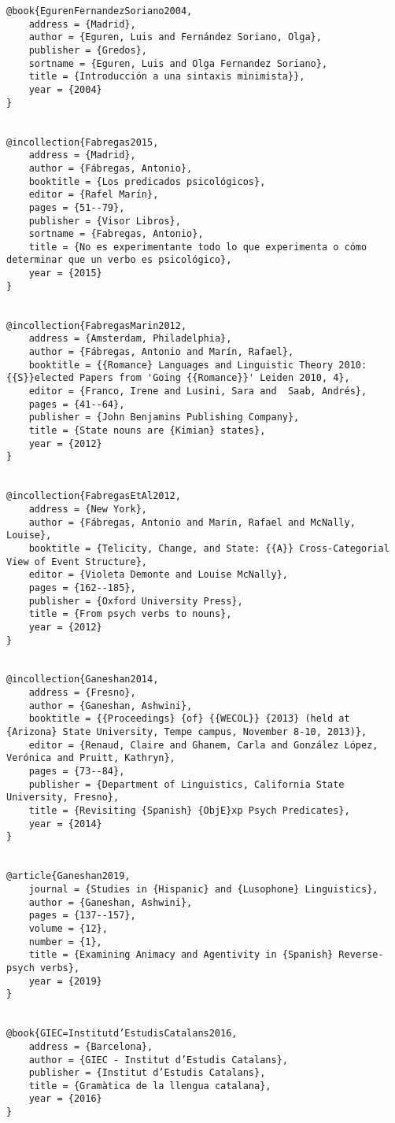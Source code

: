 \documentclass[output=paper,modfonts,nonflat,newtxmath]{langsci/langscibook}
\begin{document}
\begin{verbatim}
@book{EgurenFernandezSoriano2004,
	address = {Madrid},
	author = {Eguren, Luis and Fernández Soriano, Olga},
	publisher = {Gredos},
	sortname = {Eguren, Luis and Olga Fernandez Soriano},
	title = {Introducción a una sintaxis minimista}},
	year = {2004}
}


@incollection{Fabregas2015,
	address = {Madrid},
	author = {Fábregas, Antonio},
	booktitle = {Los predicados psicológicos},
	editor = {Rafel Marín},
	pages = {51--79},
	publisher = {Visor Libros},
	sortname = {Fabregas, Antonio},
	title = {No es experimentante todo lo que experimenta o cómo determinar que un verbo es psicológico},
	year = {2015}
}


@incollection{FabregasMarin2012,
	address = {Amsterdam, Philadelphia},
	author = {Fábregas, Antonio and Marín, Rafael},
	booktitle = {{Romance} Languages and Linguistic Theory 2010: {{S}}elected Papers from 'Going {{Romance}}' Leiden 2010, 4},
	editor = {Franco, Irene and Lusini, Sara and  Saab, Andrés},
	pages = {41--64},
	publisher = {John Benjamins Publishing Company},
	title = {State nouns are {Kimian} states},
	year = {2012}
}


@incollection{FabregasEtAl2012,
	address = {New York},
	author = {Fábregas, Antonio and Marin, Rafael and McNally, Louise},
	booktitle = {Telicity, Change, and State: {{A}} Cross-Categorial View of Event Structure},
	editor = {Violeta Demonte and Louise McNally},
	pages = {162--185},
	publisher = {Oxford University Press},
	title = {From psych verbs to nouns},
	year = {2012}
}


@incollection{Ganeshan2014,
	address = {Fresno},
	author = {Ganeshan, Ashwini},
	booktitle = {{Proceedings} {of} {{WECOL}} {2013} (held at {Arizona} State University, Tempe campus, November 8-10, 2013)},
	editor = {Renaud, Claire and Ghanem, Carla and González López, Verónica and Pruitt, Kathryn},
	pages = {73--84},
	publisher = {Department of Linguistics, California State University, Fresno},
	title = {Revisiting {Spanish} {ObjE}xp Psych Predicates},
	year = {2014}
}


@article{Ganeshan2019,
	journal = {Studies in {Hispanic} and {Lusophone} Linguistics}, 
	author = {Ganeshan, Ashwini},
	pages = {137--157},
	volume = {12},
	number = {1},
	title = {Examining Animacy and Agentivity in {Spanish} Reverse-psych verbs},
	year = {2019}
}


@book{GIEC=Institutd’EstudisCatalans2016,
	address = {Barcelona},
	author = {GIEC - Institut d’Estudis Catalans},
	publisher = {Institut d’Estudis Catalans},
	title = {Gramàtica de la llengua catalana},
	year = {2016}
}



\end{verbatim}
\end{document}
